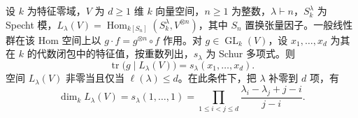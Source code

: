\begin{proposition}\label{b5:prop:schur-functor-character}
	设 \(k\) 为特征零域，\(V\) 为 \(d\ge1\) 维 \(k\) 向量空间，\(n\ge1\) 为整数，\(\lambda\vdash n\)，\(S_k^\lambda\) 为 Specht 模，\(L_\lambda(V)=\operatorname{Hom}_{k[S_n]}(S_k^\lambda,V^{\otimes n})\)，其中 \(S_n\) 置换张量因子。一般线性群在该 Hom 空间上以 \(g\cdot f=g^{\otimes n}\circ f\) 作用。对 \(g\in\operatorname{GL}_k(V)\)，设 \(x_1,\ldots,x_d\) 为其在 \(k\) 的代数闭包中的特征值，按重数列出，\(s_\lambda\) 为 Schur 多项式。则
	\[
		\operatorname{tr}\bigl(g\mid L_\lambda(V)\bigr)=s_\lambda(x_1,\ldots,x_d).
	\]
	空间 \(L_\lambda(V)\) 非零当且仅当 \(\ell(\lambda)\le d\)。在此条件下，把 \(\lambda\) 补零到 \(d\) 项，有
	\begin{equation}\label{b5:eq:schur-dimension}
		\dim_k L_\lambda(V) =s_\lambda(1,\ldots,1) =\prod_{1\le i<j\le d}\frac{\lambda_i-\lambda_j+j-i}{j-i}.
	\end{equation}
\end{proposition}
